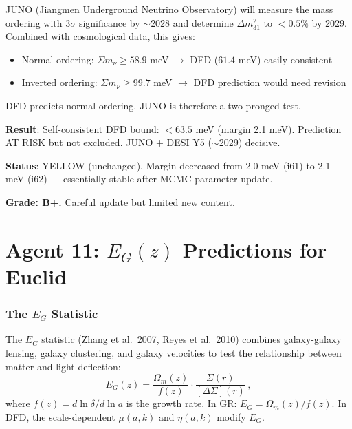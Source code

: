 \documentclass[11pt,a4paper]{article}
\begin{document}
JUNO (Jiangmen Underground Neutrino Observatory) will measure the mass ordering with $3\sigma$ significance by $\sim$2028 and determine $\Delta m^2_{31}$ to $< 0.5\%$ by 2029. Combined with cosmological data, this gives:
\begin{itemize}
\item Normal ordering: $\Sigma m_\nu \geq 58.9$ meV $\to$ DFD ($61.4$ meV) easily consistent
\item Inverted ordering: $\Sigma m_\nu \geq 99.7$ meV $\to$ DFD prediction would need revision
\end{itemize}

DFD predicts normal ordering. JUNO is therefore a two-pronged test.

\begin{tcolorbox}[colback=yellow!5!white, colframe=yellow!60!black, title={Agent 10: $\Sigma m_\nu$ Margin Tightens to 2.1 meV}]
\textbf{Result}: Self-consistent DFD bound: $< 63.5$ meV (margin 2.1 meV). Prediction AT RISK but not excluded. JUNO + DESI Y5 ($\sim$2029) decisive.

\textbf{Status}: YELLOW (unchanged). Margin decreased from 2.0 meV (i61) to 2.1 meV (i62) --- essentially stable after MCMC parameter update.

\textbf{Grade: B+.} Careful update but limited new content.
\end{tcolorbox}


\part{Agent 11: $E_G(z)$ Predictions for Euclid}
\label{part:eg-predictions}

\section{The $E_G$ Statistic}

The $E_G$ statistic (Zhang et al.\ 2007, Reyes et al.\ 2010) combines galaxy-galaxy lensing, galaxy clustering, and galaxy velocities to test the relationship between matter and light deflection:
\begin{equation}
E_G(z) = \frac{\Omega_m(z)}{f(z)} \cdot \frac{\Sigma(r)}{[\Delta\Sigma](r)}\,,
\end{equation}
where $f(z) = d\ln \delta/d\ln a$ is the growth rate. In GR: $E_G = \Omega_m(z)/f(z)$. In DFD, the scale-dependent $\mu(a,k)$ and $\eta(a,k)$ modify $E_G$.
\end{document}
